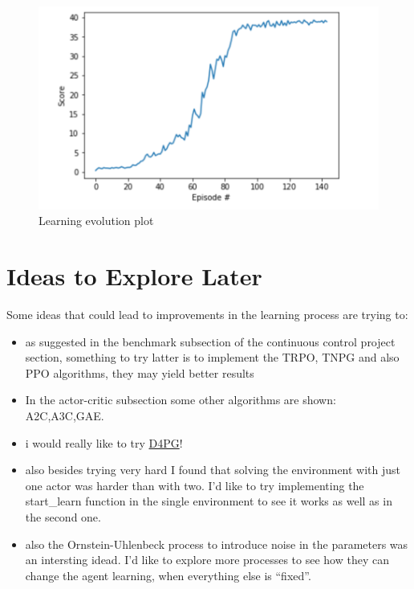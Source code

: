 \documentclass[
]{article}
\begin{document}
\begin{figure}
\centering
\includegraphics{imgs/results_2.png}
\caption{Learning evolution plot}
\end{figure}

\pagebreak

\hypertarget{ideas-to-explore-later}{%
\section{Ideas to Explore Later}\label{ideas-to-explore-later}}

Some ideas that could lead to improvements in the learning process are
trying to:

\begin{itemize}
\item
  as suggested in the benchmark subsection of the continuous control
  project section, something to try latter is to implement the TRPO,
  TNPG and also PPO algorithms, they may yield better results
\item
  In the actor-critic subsection some other algorithms are shown:
  A2C,A3C,GAE.
\item
  i would really like to try
  \href{https://openreview.net/pdf?id=SyZipzbCb}{D4PG}!
\item
  also besides trying very hard I found that solving the environment
  with just one actor was harder than with two. I'd like to try
  implementing the start\_learn function in the single environment to
  see it works as well as in the second one.
\item
  also the Ornstein-Uhlenbeck process to introduce noise in the
  parameters was an intersting idead. I'd like to explore more processes
  to see how they can change the agent learning, when everything else is
  ``fixed''.
\end{itemize}
\end{document}
